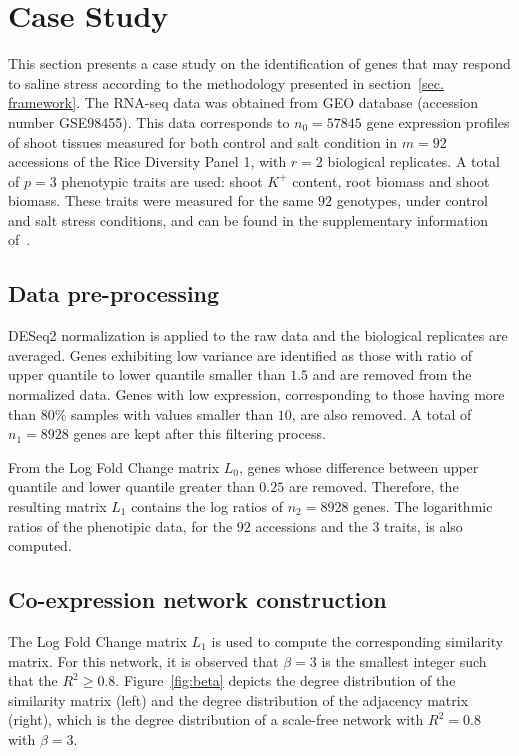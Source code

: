 \section{Case Study}
\label{sec.case}
This section presents a case study on the identification of genes that may respond to saline stress according to the methodology presented in section~\ref{sec. framework}. 
The RNA-seq data was obtained from GEO database
\cite{GEOAcces90:online} (accession number GSE98455). This data
corresponds to $n_0=57845$ gene expression profiles of shoot tissues
measured for both control and salt condition in $m=92$ accessions of
the Rice Diversity Panel 1, with $r=2$ biological replicates. A total
of $p=3 $ phenotypic traits are used: shoot $K^+$ content, root
biomass and shoot biomass. These traits were measured for the same
$92$ genotypes, under control and salt stress conditions, and can be
found in the supplementary information
of~\cite{campbell2017allelic}.

\subsection{Data pre-processing}

DESeq2 normalization is applied to the raw data and the biological
replicates are averaged. Genes exhibiting low variance are
identified as those with ratio of upper quantile to lower quantile
smaller than $1.5$ and are removed from the normalized data. Genes
with low expression, corresponding to those having more than $80\%$
samples with values smaller than $10$, are also removed. A total of
$n_1 = 8928$ genes are kept after this filtering process.

From the Log Fold Change matrix $L_0$, genes whose difference between
upper quantile and lower quantile greater than $0.25$ are
removed. Therefore, the resulting matrix $L_1$ contains the log ratios
of $n_2 = 8928$ genes. The logarithmic ratios of the phenotipic data,
for the $92$ accessions and the $3$ traits, is also computed.

\subsection{Co-expression network construction}

The Log Fold Change matrix $L_1$ is used to compute the corresponding
similarity matrix.  For this network, it is observed that $\beta=3$
is the smallest integer such that the $R^2 \geq 0.8
$. Figure~\ref{fig:beta} depicts the degree distribution of the
similarity matrix (left) and the degree distribution of the adjacency
matrix (right), which is the degree distribution of a scale-free
network with $R^2 = 0.8$ with $\beta = 3$.

